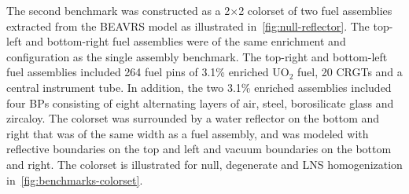 The second benchmark was constructed as a 2$\times$2 colorset of two fuel assemblies extracted from the BEAVRS model as illustrated in~\autoref{fig:null-reflector}. The top-left and bottom-right fuel assemblies were of the same enrichment and configuration as the single assembly benchmark. The top-right and bottom-left fuel assemblies included 264 fuel pins of 3.1\% enriched UO$_2$ fuel, 20 CRGTs and a central instrument tube. In addition, the two 3.1\% enriched assemblies included four BPs consisting of eight alternating layers of air, steel, borosilicate glass and zircaloy. The colorset was surrounded by a water reflector on the bottom and right that was of the same width as a fuel assembly, and was modeled with reflective boundaries on the top and left and vacuum boundaries on the bottom and right. The colorset is illustrated for null, degenerate and LNS homogenization in~\autoref{fig:benchmarks-colorset}.


